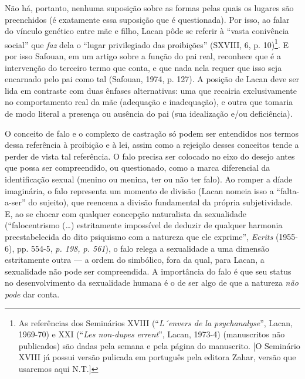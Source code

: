 Não há, portanto, nenhuma suposição sobre as formas pelas quais os
lugares são preenchidos (é exatamente essa suposição que é questionada).
Por isso, ao falar do vínculo genético entre mãe e filho, Lacan pôde se
referir à ``vasta conivência social'' que \emph{faz} dela o ``lugar
privilegiado das proibições'' (SXVIII, 6, p. 10)\footnote{As referências
  dos Seminários XVIII (``\emph{L´envers de la psychanalyse}'', Lacan,
  1969-70) e XXI (``\emph{Les non-dupes errent}'', Lacan, 1973-4)
  (manuscritos não publicados) são dadas pela semana e pela página do
  manuscrito. {[}O Seminário XVIII já possui versão pulicada em
  português pela editora Zahar, versão que usaremos aqui N.T.{]}}. E por
isso Safouan, em um artigo sobre a função do pai real, reconhece que é a
intervenção do terceiro termo que conta, e que nada nela requer que isso
seja encarnado pelo pai como tal (Safouan, 1974, p. 127). A posição de
Lacan deve ser lida em contraste com duas ênfases alternativas: uma que
recairia exclusivamente no comportamento real da mãe (adequação e
inadequação), e outra que tomaria de modo literal a presença ou ausência
do pai (sua idealização e/ou deficiência).

O conceito de falo e o complexo de castração só podem ser entendidos nos
termos dessa referência à proibição e à lei, assim como a rejeição
desses conceitos tende a perder de vista tal referência. O falo precisa
ser colocado no eixo do desejo antes que possa ser compreendido, ou
questionado, como a marca diferencial da identificação sexual (menino ou
menina, ter ou não ter falo). Ao romper a díade imaginária, o falo
representa um momento de divisão (Lacan nomeia isso a ``falta-a-ser'' do
sujeito), que reencena a divisão fundamental da própria subjetividade.
E, ao se chocar com qualquer concepção naturalista da sexualidade
(``falocentrismo (\ldots{}) estritamente impossível de deduzir de qualquer
harmonia preestabelecida do dito psiquismo com a natureza que ele
exprime'', \emph{Ecrits} (1955-6), pp. 554-5, \emph{p. 198, p. 561}), o
falo relega a sexualidade a uma dimensão estritamente outra --- a ordem
do simbólico, fora da qual, para Lacan, a sexualidade não pode ser
compreendida. A importância do falo é que seu status no desenvolvimento
da sexualidade humana é o de ser algo de que a natureza \emph{não pode}
dar conta.

